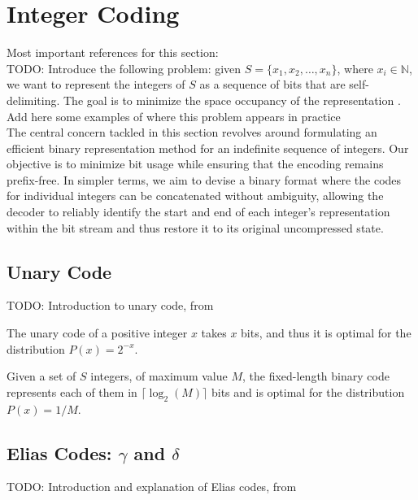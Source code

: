 \section{Integer Coding}

Most important references for this section: \cite{ferragina2023pearls,sayood2002lossless,navarro2016compact} \\

\noindent TODO: Introduce the following problem: given $S=\{x_1,x_2,\ldots,x_n\}$, where $x_i\in\mathbb{N}$, we want to represent the integers of $S$ as a sequence of bits that are self-delimiting. The goal is to minimize the space occupancy of the representation \cite{ferragina2023pearls}. Add here some examples of where this problem appears in practice \cite{witten1999managing} \\

\noindent The central concern tackled in this section revolves around formulating an efficient binary representation method for an indefinite sequence of integers. Our objective is to minimize bit usage while ensuring that the encoding remains prefix-free. In simpler terms, we aim to devise a binary format where the codes for individual integers can be concatenated without ambiguity, allowing the decoder to reliably identify the start and end of each integer's representation within the bit stream and thus restore it to its original uncompressed state.

\subsection{Unary Code}
TODO: Introduction to unary code, from \cite{ferragina2023pearls,sayood2002lossless}

\begin{theorem}
    The unary code of a positive integer $x$ takes $x$ bits, and thus it is optimal for the distribution $P(x)=2^{-x}$. \cite{ferragina2023pearls}
\end{theorem}

\begin{theorem}
    Given a set of $S$ integers, of maximum value $M$, the fixed-length binary code represents each of them in $\lceil\log_2(M)\rceil$ bits and is optimal for the distribution $P(x)=1/M$. \cite{ferragina2023pearls}
\end{theorem}

\subsection{Elias Codes: $\gamma$ and $\delta$}
TODO: Introduction and explanation of Elias codes, from \cite{ferragina2023pearls,Elias1975}

